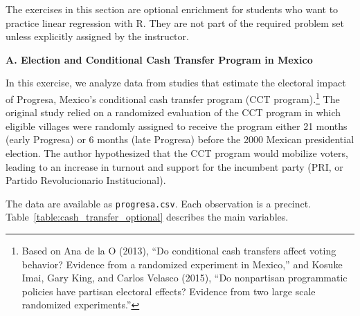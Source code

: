 \documentclass[12pt]{article}
\begin{document}
\noindent The exercises in this section are optional enrichment for students who want to practice linear regression with R. They are not part of the required problem set unless explicitly assigned by the instructor.

\begin{center}
    \textbf{\large A. Election and Conditional Cash Transfer Program in Mexico}
\end{center}

In this exercise, we analyze data from studies that estimate the electoral impact of Progresa, Mexico's conditional cash transfer program (CCT program).\footnote{Based on Ana de la O (2013), ``Do conditional cash transfers affect voting behavior? Evidence from a randomized experiment in Mexico,'' and Kosuke Imai, Gary King, and Carlos Velasco (2015), ``Do nonpartisan programmatic policies have partisan electoral effects? Evidence from two large scale randomized experiments.''} The original study relied on a randomized evaluation of the CCT program in which eligible villages were randomly assigned to receive the program either 21 months (early Progresa) or 6 months (late Progresa) before the 2000 Mexican presidential election. The author hypothesized that the CCT program would mobilize voters, leading to an increase in turnout and support for the incumbent party (PRI, or Partido Revolucionario Institucional).

The data are available as \texttt{progresa.csv}. Each observation is a precinct. Table~\ref{table:cash_transfer_optional} describes the main variables.
\end{document}

